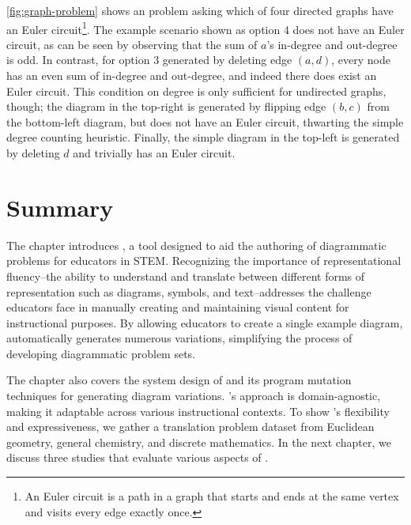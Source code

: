 \cref{fig:graph-problem} shows an \Edgeworth problem asking which of four directed graphs have an Euler circuit\footnote{An Euler circuit is a path in a graph that starts and ends at the same vertex and visits every edge exactly once.}. The example scenario shown as option 4 does not have an Euler circuit, as can be seen by observing that the sum of $a$'s in-degree and out-degree is odd. In contrast, for option 3 generated by deleting edge $(a, d)$, every node has an even sum of in-degree and out-degree, and indeed there does exist an Euler circuit. This condition on degree is only sufficient for undirected graphs, though; the diagram in the top-right is generated by flipping edge $(b, c)$ from the bottom-left diagram, but does not have an Euler circuit, thwarting the simple degree counting heuristic. Finally, the simple diagram in the top-left is generated by deleting $d$ and trivially has an Euler circuit. 

\section{Summary}

The chapter introduces \Edgeworth, a tool designed to aid the authoring of diagrammatic problems for educators in STEM. Recognizing the importance of representational fluency--the ability to understand and translate between different forms of representation such as diagrams, symbols, and text--\Edgeworth addresses the challenge educators face in manually creating and maintaining visual content for instructional purposes. By allowing educators to create a single example diagram, \Edgeworth automatically generates numerous variations, simplifying the process of developing diagrammatic problem sets. 

The chapter also covers the system design of \Edgeworth{} and its program mutation techniques for generating diagram variations. \Edgeworth's approach is domain-agnostic, making it adaptable across various instructional contexts. To show \Edgeworth's flexibility and expressiveness, we gather a translation problem dataset from Euclidean geometry, general chemistry, and discrete mathematics. In the next chapter, we discuss three studies that evaluate various aspects of \Edgeworth.


